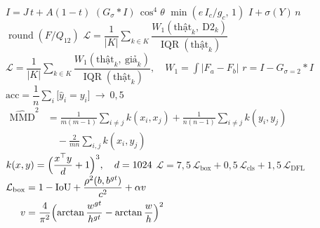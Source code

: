 \documentclass[border=1.5pt,multi=eqn]{standalone}
\newenvironment{eqn}[1]{\fontsize{18}{22}\selectfont\color[HTML]{#1}$\displaystyle}{$}
\begin{document}
\begin{eqn}{0E2238}I=J\,t+A(1-t)\end{eqn}
\begin{eqn}{0E2238}(G_\sigma\ast I)\,\cos^{4}\theta\end{eqn}
\begin{eqn}{0E2238}\min(e\,I_c/g_c,\,1)\end{eqn}
\begin{eqn}{0E2238}I+\sigma(Y)\,n\end{eqn}
\begin{eqn}{0E2238}\operatorname{round}(F/Q_{12})\end{eqn}
\begin{eqn}{FFFFFF}\mathcal{L}=\dfrac{1}{|K|}\sum_{k\in K}\dfrac{W_1(\text{thật}_k,\ \text{D2}_k)}{\operatorname{IQR}(\text{thật}_k)}\end{eqn}
\begin{eqn}{0E2238}\mathcal{L}=\dfrac{1}{|K|}\sum_{k\in K}\dfrac{W_1(\text{thật}_k,\ \text{giả}_k)}{\operatorname{IQR}(\text{thật}_k)},\quad W_1=\int\bigl|F_a-F_b\bigr|\end{eqn}
\begin{eqn}{0E2238}r=I-G_{\sigma=2}\ast I\end{eqn}
\begin{eqn}{0E2238}\mathrm{acc}=\dfrac{1}{n}\sum_{i}\bigl[\hat y_i=y_i\bigr]\ \to\ 0{,}5\end{eqn}
\begin{eqn}{0E2238}\begin{aligned}\widehat{\mathrm{MMD}}^{2}&=\tfrac{1}{m(m-1)}\sum_{i\neq j}k(x_i,x_j)+\tfrac{1}{n(n-1)}\sum_{i\neq j}k(y_i,y_j)\\&\quad-\tfrac{2}{mn}\sum_{i,j}k(x_i,y_j)\end{aligned}\end{eqn}
\begin{eqn}{0E2238}k(x,y)=\Bigl(\dfrac{x^{\top}y}{d}+1\Bigr)^{3},\quad d=1024\end{eqn}
\begin{eqn}{0E2238}\mathcal{L}=7{,}5\,\mathcal{L}_{\text{box}}+0{,}5\,\mathcal{L}_{\text{cls}}+1{,}5\,\mathcal{L}_{\text{DFL}}\end{eqn}
\begin{eqn}{0E2238}\begin{aligned}\mathcal{L}_{\text{box}}&=1-\mathrm{IoU}+\dfrac{\rho^{2}(b,b^{gt})}{c^{2}}+\alpha v\\ v&=\dfrac{4}{\pi^{2}}\Bigl(\arctan\dfrac{w^{gt}}{h^{gt}}-\arctan\dfrac{w}{h}\Bigr)^{2}\end{aligned}\end{eqn}
\end{document}
